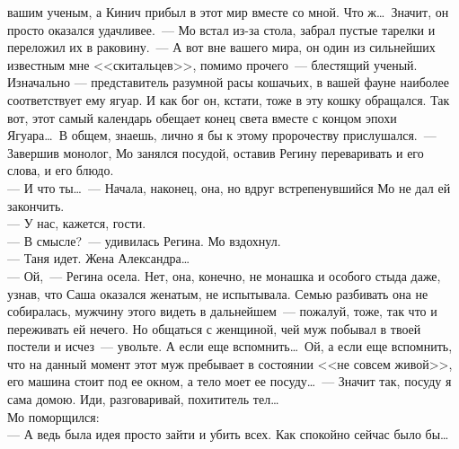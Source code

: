 вашим ученым, а Кинич прибыл в этот мир вместе со мной. Что ж\ldots\ Значит, он 
просто оказался удачливее.~--- Мо встал из-за стола, забрал пустые тарелки и 
переложил их в раковину.~--- А вот вне вашего мира, он один из сильнейших 
известным мне <<скитальцев>>, помимо прочего~--- блестящий ученый. Изначально 
--- представитель разумной расы кошачьих, в вашей фауне наиболее соответствует 
ему ягуар. И как бог он, кстати, тоже в эту кошку обращался. Так вот, этот 
самый календарь обещает конец света вместе с концом эпохи Ягуара\ldots\ В 
общем, знаешь, лично я бы к этому пророчеству прислушался.~--- Завершив 
монолог, Мо занялся посудой, оставив Регину переваривать и его слова, и его 
блюдо.\\
--- И что ты\ldots~--- Начала, наконец, она, но вдруг встрепенувшийся Мо 
не дал ей закончить.\\
--- У нас, кажется, гости.\\
--- В смысле?~--- удивилась Регина. Мо вздохнул.\\
--- Таня идет. Жена Александра\ldots\\
--- Ой,~--- Регина осела. Нет, она, конечно, не монашка и особого стыда даже, 
узнав, что Саша оказался женатым, не испытывала. Семью разбивать она не 
собиралась, мужчину этого видеть в дальнейшем~--- пожалуй, тоже, так что и 
переживать ей нечего. Но общаться с женщиной, чей муж побывал в твоей постели и 
исчез~--- увольте. А если еще вспомнить\ldots\ Ой, а если еще вспомнить, что 
на данный момент этот муж пребывает в состоянии <<не совсем живой>>, его 
машина стоит под ее окном, а тело моет ее посуду\ldots~--- Значит так, 
посуду я сама домою. Иди, разговаривай, похититель тел\ldots\\
Мо поморщился:\\
--- А ведь была идея просто зайти и убить всех. Как спокойно сейчас было 
бы\ldots

